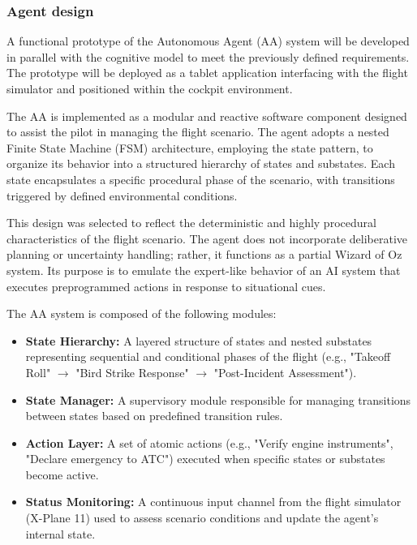 \documentclass[12pt,a4paper]{article} %
\begin{document}


	\subsubsection{Agent design}
	A functional prototype of the Autonomous Agent (AA) system will be developed in parallel with the cognitive model to meet the previously defined requirements. The prototype will be deployed as a tablet application interfacing with the flight simulator and positioned within the cockpit environment.

	The AA is implemented as a modular and reactive software component designed to assist the pilot in managing the flight scenario. The agent adopts a nested Finite State Machine (FSM) architecture, employing the state pattern, to organize its behavior into a structured hierarchy of states and substates. Each state encapsulates a specific procedural phase of the scenario, with transitions triggered by defined environmental conditions.
	
	This design was selected to reflect the deterministic and highly procedural characteristics of the flight scenario. The agent does not incorporate deliberative planning or uncertainty handling; rather, it functions as a partial Wizard of Oz system. Its purpose is to emulate the expert-like behavior of an AI system that executes preprogrammed actions in response to situational cues.
	
	The AA system is composed of the following modules: \begin{itemize} \item \textbf{State Hierarchy:} A layered structure of states and nested substates representing sequential and conditional phases of the flight (e.g., "Takeoff Roll" $\rightarrow$ "Bird Strike Response" $\rightarrow$ "Post-Incident Assessment"). \item \textbf{State Manager:} A supervisory module responsible for managing transitions between states based on predefined transition rules. \item \textbf{Action Layer:} A set of atomic actions (e.g., "Verify engine instruments", "Declare emergency to ATC") executed when specific states or substates become active. \item \textbf{Status Monitoring:} A continuous input channel from the flight simulator (X-Plane 11) used to assess scenario conditions and update the agent's internal state. \end{itemize}
	
\end{document}

